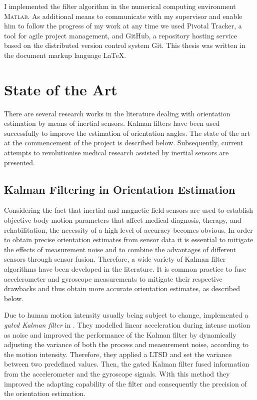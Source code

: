 I implemented the filter algorithm in the numerical computing environment \textsc{Matlab}\textsuperscript{\textregistered}. As additional means to communicate with my supervisor and enable him to follow the progress of my work at any time we used Pivotal Tracker, a tool for agile project management, and GitHub, a repository hosting service based on the distributed version control system Git. This thesis was written in the document markup language \LaTeX{}.
 
\section{State of the Art}\label{sec:state_of_the_art}

There are several research works in the literature dealing with orientation estimation by means of inertial sensors. Kalman filters have been used successfully to improve the estimation of orientation angles. The state of the art at the commencement of the project is described below. Subsequently, current attempts to revolutionise medical research assisted by inertial sensors are presented.

\subsection{Kalman Filtering in Orientation Estimation}

Considering the fact that inertial and magnetic field sensors are used to establish objective body motion parameters that affect medical diagnosis, therapy, and rehabilitation, the necessity of a high level of accuracy becomes obvious. In order to obtain precise orientation estimates from sensor data it is essential to mitigate the effects of measurement noise and to combine the advantages of different  sensors through sensor fusion. Therefore, a wide variety of Kalman filter algorithms have been developed in the literature. It is common practice to fuse accelerometer and gyroscope measurements to mitigate their respective drawbacks and thus obtain more accurate orientation estimates, as described below.

Due to human motion intensity usually being subject to change, \citeauthor{olivares_vicente_signal_2013} implemented a \emph{gated Kalman filter} in \cite{olivares_vicente_signal_2013}. They modelled linear acceleration during intense motion as noise and improved the performance of the Kalman filter by dynamically adjusting the variance of both the process and measurement noise, according to the motion intensity. Therefore, they applied a \gls{LTSD} and set the variance between two predefined values. Then, the gated Kalman filter fused information from the accelerometer and the gyroscope signals. With this method they improved the adapting capability of the filter and consequently the precision of the orientation estimation.

